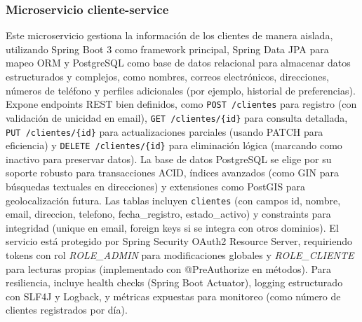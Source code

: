\documentclass[a4paper,12pt]{article}
\begin{document}
\subsubsection{Microservicio cliente-service}
Este microservicio gestiona la información de los clientes de manera aislada, utilizando Spring Boot 3 como framework principal, Spring Data JPA para mapeo ORM y PostgreSQL como base de datos relacional para almacenar datos estructurados y complejos, como nombres, correos electrónicos, direcciones, números de teléfono y perfiles adicionales (por ejemplo, historial de preferencias). Expone endpoints REST bien definidos, como \texttt{POST /clientes} para registro (con validación de unicidad en email), \texttt{GET /clientes/\{id\}} para consulta detallada, \texttt{PUT /clientes/\{id\}} para actualizaciones parciales (usando PATCH para eficiencia) y \texttt{DELETE /clientes/\{id\}} para eliminación lógica (marcando como inactivo para preservar datos). La base de datos PostgreSQL se elige por su soporte robusto para transacciones ACID, índices avanzados (como GIN para búsquedas textuales en direcciones) y extensiones como PostGIS para geolocalización futura. Las tablas incluyen \texttt{clientes} (con campos id, nombre, email, direccion, telefono, fecha\_registro, estado\_activo) y constraints para integridad (unique en email, foreign keys si se integra con otros dominios). El servicio está protegido por Spring Security OAuth2 Resource Server, requiriendo tokens con rol \textit{ROLE\_ADMIN} para modificaciones globales y \textit{ROLE\_CLIENTE} para lecturas propias (implementado con @PreAuthorize en métodos). Para resiliencia, incluye health checks (Spring Boot Actuator), logging estructurado con SLF4J y Logback, y métricas expuestas para monitoreo (como número de clientes registrados por día).
\end{document}
